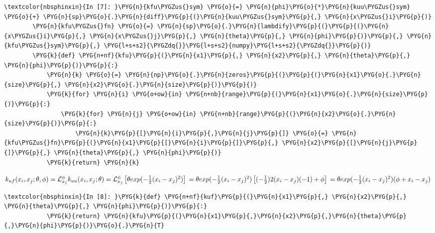 \documentclass[letterpaper,10pt,english]{sphinxmanual}
\begin{document}
%
\begin{Verbatim}[commandchars=\\\{\}]
\textcolor{nbsphinxin}{In [7]: }\PYG{n}{kfu\PYGZus{}sym} \PYG{o}{=} \PYG{n}{phi}\PYG{o}{*}\PYG{n}{kuu\PYGZus{}sym} \PYG{o}{+} \PYG{n}{sp}\PYG{o}{.}\PYG{n}{diff}\PYG{p}{(}\PYG{n}{kuu\PYGZus{}sym}\PYG{p}{,} \PYG{n}{x\PYGZus{}i}\PYG{p}{)}
        \PYG{n}{kfu\PYGZus{}fn} \PYG{o}{=} \PYG{n}{sp}\PYG{o}{.}\PYG{n}{lambdify}\PYG{p}{(}\PYG{p}{(}\PYG{n}{x\PYGZus{}i}\PYG{p}{,} \PYG{n}{x\PYGZus{}j}\PYG{p}{,} \PYG{n}{theta}\PYG{p}{,} \PYG{n}{phi}\PYG{p}{)}\PYG{p}{,} \PYG{n}{kfu\PYGZus{}sym}\PYG{p}{,} \PYG{l+s+s2}{\PYGZdq{}}\PYG{l+s+s2}{numpy}\PYG{l+s+s2}{\PYGZdq{}}\PYG{p}{)}
        \PYG{k}{def} \PYG{n+nf}{kfu}\PYG{p}{(}\PYG{n}{x1}\PYG{p}{,} \PYG{n}{x2}\PYG{p}{,} \PYG{n}{theta}\PYG{p}{,} \PYG{n}{phi}\PYG{p}{)}\PYG{p}{:}
            \PYG{n}{k} \PYG{o}{=} \PYG{n}{np}\PYG{o}{.}\PYG{n}{zeros}\PYG{p}{(}\PYG{p}{(}\PYG{n}{x1}\PYG{o}{.}\PYG{n}{size}\PYG{p}{,} \PYG{n}{x2}\PYG{o}{.}\PYG{n}{size}\PYG{p}{)}\PYG{p}{)}
            \PYG{k}{for} \PYG{n}{i} \PYG{o+ow}{in} \PYG{n+nb}{range}\PYG{p}{(}\PYG{n}{x1}\PYG{o}{.}\PYG{n}{size}\PYG{p}{)}\PYG{p}{:}
                \PYG{k}{for} \PYG{n}{j} \PYG{o+ow}{in} \PYG{n+nb}{range}\PYG{p}{(}\PYG{n}{x2}\PYG{o}{.}\PYG{n}{size}\PYG{p}{)}\PYG{p}{:}
                    \PYG{n}{k}\PYG{p}{[}\PYG{n}{i}\PYG{p}{,}\PYG{n}{j}\PYG{p}{]} \PYG{o}{=} \PYG{n}{kfu\PYGZus{}fn}\PYG{p}{(}\PYG{n}{x1}\PYG{p}{[}\PYG{n}{i}\PYG{p}{]}\PYG{p}{,} \PYG{n}{x2}\PYG{p}{[}\PYG{n}{j}\PYG{p}{]}\PYG{p}{,} \PYG{n}{theta}\PYG{p}{,} \PYG{n}{phi}\PYG{p}{)}
            \PYG{k}{return} \PYG{n}{k}
\end{Verbatim}

\(k_{uf}(x_i,x_j;\theta,\phi) \\ = \mathcal{L}_{x_j}^\phi k_{uu}(x_i, x_j; \theta) \\ = \mathcal{L}_{x_j}^\phi \left[ \theta exp(-\frac{1}{2}(x_i-x_j)^2) \right] \\ = \theta exp(-\frac{1}{2}(x_i-x_j)^2) \left[ (-\frac{1}{2})2(x_i-x_j)(-1) + \phi \right]\\ = \theta exp(-\frac{1}{2}(x_i-x_j)^2)(\phi+x_i-x_j)\)

%
\begin{Verbatim}[commandchars=\\\{\}]
\textcolor{nbsphinxin}{In [8]: }\PYG{k}{def} \PYG{n+nf}{kuf}\PYG{p}{(}\PYG{n}{x1}\PYG{p}{,} \PYG{n}{x2}\PYG{p}{,} \PYG{n}{theta}\PYG{p}{,} \PYG{n}{phi}\PYG{p}{)}\PYG{p}{:}
            \PYG{k}{return} \PYG{n}{kfu}\PYG{p}{(}\PYG{n}{x1}\PYG{p}{,}\PYG{n}{x2}\PYG{p}{,}\PYG{n}{theta}\PYG{p}{,}\PYG{n}{phi}\PYG{p}{)}\PYG{o}{.}\PYG{n}{T}
\end{Verbatim}
\end{document}

